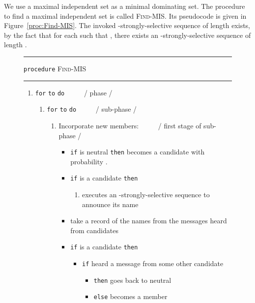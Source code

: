 \documentclass[11pt]{article}
\newcommand{\FF}{\vspace*{\medskipamount}}
\begin{document}
We use a maximal independent set as a minimal dominating set.
The procedure to find a maximal independent set is called \textsc{Find-MIS}.
Its pseudocode is given in Figure~\ref{proc:Find-MIS}.
The invoked -strongly-selective sequence of length  exists, by the fact that for each  such that , there exists an -strongly-selective sequence of length .




\begin{figure}[t]
\hrule

\FF
 
\texttt{procedure} \textsc{Find-MIS} 

\FF

\hrule

\FF

\begin{enumerate}[nosep,leftmargin=*]
\item[]
\texttt{for}  \texttt{to}  \texttt{do}
~ ~ ~ / phase  /					
\begin{enumerate}[nosep,leftmargin=*]
\item[]
\texttt{for}  \texttt{to}  \texttt{do}
~ ~ ~ / sub-phase  /
\begin{enumerate}[nosep]
\item
Incorporate new  members:
~ ~ ~ / first stage of sub-phase  /
\begin{itemize}[nosep]
\item[]
\texttt{if}  is neutral \texttt{then}  becomes a candidate with probability . 
\item[]
\texttt{if}  is a candidate \texttt{then} 
\begin{enumerate}[nosep]
\item[]
 executes an -strongly-selective sequence to announce its name
\end{enumerate}
\item[]
take a record of the names from the messages heard  from candidates 
\item[]
\texttt{if}  is a candidate \texttt{then}
\begin{itemize}[nosep]
\item[]
\texttt{if}  heard a message from some other candidate 
\begin{itemize}[nosep]
\item[]
\texttt{then}  goes back to neutral 
\item[]
\texttt{else}  becomes a member
\end{itemize}
\end{itemize}
\end{itemize}

\end{enumerate}
\end{enumerate}
\end{enumerate}
\end{figure}
\end{document}
